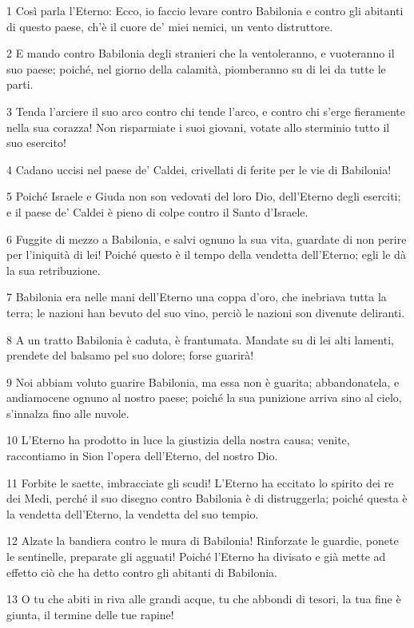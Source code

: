 \par 1 Così parla l'Eterno: Ecco, io faccio levare contro Babilonia e contro gli abitanti di questo paese, ch'è il cuore de' miei nemici, un vento distruttore.
\par 2 E mando contro Babilonia degli stranieri che la ventoleranno, e vuoteranno il suo paese; poiché, nel giorno della calamità, piomberanno su di lei da tutte le parti.
\par 3 Tenda l'arciere il suo arco contro chi tende l'arco, e contro chi s'erge fieramente nella sua corazza! Non risparmiate i suoi giovani, votate allo sterminio tutto il suo esercito!
\par 4 Cadano uccisi nel paese de' Caldei, crivellati di ferite per le vie di Babilonia!
\par 5 Poiché Israele e Giuda non son vedovati del loro Dio, dell'Eterno degli eserciti; e il paese de' Caldei è pieno di colpe contro il Santo d'Israele.
\par 6 Fuggite di mezzo a Babilonia, e salvi ognuno la sua vita, guardate di non perire per l'iniquità di lei! Poiché questo è il tempo della vendetta dell'Eterno; egli le dà la sua retribuzione.
\par 7 Babilonia era nelle mani dell'Eterno una coppa d'oro, che inebriava tutta la terra; le nazioni han bevuto del suo vino, perciò le nazioni son divenute deliranti.
\par 8 A un tratto Babilonia è caduta, è frantumata. Mandate su di lei alti lamenti, prendete del balsamo pel suo dolore; forse guarirà!
\par 9 Noi abbiam voluto guarire Babilonia, ma essa non è guarita; abbandonatela, e andiamocene ognuno al nostro paese; poiché la sua punizione arriva sino al cielo, s'innalza fino alle nuvole.
\par 10 L'Eterno ha prodotto in luce la giustizia della nostra causa; venite, raccontiamo in Sion l'opera dell'Eterno, del nostro Dio.
\par 11 Forbite le saette, imbracciate gli scudi! L'Eterno ha eccitato lo spirito dei re dei Medi, perché il suo disegno contro Babilonia è di distruggerla; poiché questa è la vendetta dell'Eterno, la vendetta del suo tempio.
\par 12 Alzate la bandiera contro le mura di Babilonia! Rinforzate le guardie, ponete le sentinelle, preparate gli agguati! Poiché l'Eterno ha divisato e già mette ad effetto ciò che ha detto contro gli abitanti di Babilonia.
\par 13 O tu che abiti in riva alle grandi acque, tu che abbondi di tesori, la tua fine è giunta, il termine delle tue rapine!

